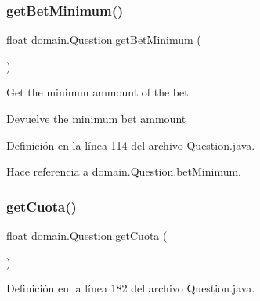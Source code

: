 \subsubsection{\texorpdfstring{getBetMinimum()}{getBetMinimum()}}
{\footnotesize\ttfamily float domain.\+Question.\+get\+Bet\+Minimum (\begin{DoxyParamCaption}{ }\end{DoxyParamCaption})}

Get the minimun ammount of the bet

\begin{DoxyReturn}{Devuelve}
the minimum bet ammount 
\end{DoxyReturn}


Definición en la línea 114 del archivo Question.\+java.


\begin{DoxyCode}{0}

\end{DoxyCode}


Hace referencia a domain.\+Question.\+bet\+Minimum.

\mbox{\label{classdomain_1_1Question_ac4679028e21545e9d342c6dfbb4e7273}} 
\subsubsection{\texorpdfstring{getCuota()}{getCuota()}}
{\footnotesize\ttfamily float domain.\+Question.\+get\+Cuota (\begin{DoxyParamCaption}{ }\end{DoxyParamCaption})}



Definición en la línea 182 del archivo Question.\+java.


\begin{DoxyCode}{0}

\end{DoxyCode}


